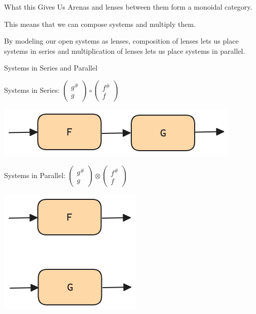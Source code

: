 \documentclass{beamer}
\begin{document}
\begin{frame}{What this Gives Us}
    Arenas and lenses between them form a monoidal category.

    \vspace*{0.125in}
    This means that we can compose systems and multiply them.

    \vspace*{0.125in}
    By modeling our open systems as lenses, composition of lenses lets us place systems in series and multiplication of lenses lets us place systems in parallel.
\end{frame}


\begin{frame}{Systems in Series and Parallel}
    \begin{center}
        Systems in Series:
        $\begin{pmatrix}g^\# \\ g\end{pmatrix} \circ \begin{pmatrix}f^\# \\ f\end{pmatrix}$

        \includegraphics[scale=0.25]{Systems_Series.png}

        \vspace*{0.25in}
        Systems in Parallel:
        $\begin{pmatrix}g^\# \\ g\end{pmatrix} \otimes \begin{pmatrix}f^\# \\ f\end{pmatrix}$

        \includegraphics[scale=0.25]{Systems_Parallel.png}

    \end{center}




\end{frame}
\end{document}
